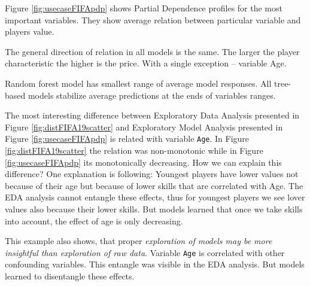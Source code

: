 \documentclass[]{krantz}
\begin{document}
Figure \ref{fig:usecaseFIFApdp} shows Partial Dependence profiles for the most important variables. They show average relation between particular variable and players value.

The general direction of relation in all models is the same. The larger the player characteristic the higher is the price. With a single exception -- variable Age.

Random forest model has smallest range of average model responses. All tree-based models stabilize average predictions at the ends of variables ranges.

The most interesting difference between Exploratory Data Analysis presented in Figure \ref{fig:distFIFA19scatter} and Exploratory Model Analysis presented in Figure \ref{fig:usecaseFIFApdp} is related with variable \texttt{Age}. In Figure \ref{fig:distFIFA19scatter} the relation was non-monotonic while in Figure \ref{fig:usecaseFIFApdp} its monotonically decreasing.
How we can explain this difference?
One explanation is following: Youngest players have lower values not because of their age but because of lower skills that are correlated with Age. The EDA analysis cannot entangle these effects, thus for youngest players we see lover values also because their lower skills. But models learned that once we take skills into account, the effect of age is only decreasing.

This example also shows, that proper \emph{exploration of models may be more insightful than exploration of raw data}. Variable \texttt{Age} is correlated with other confounding variables. This entangle was visible in the EDA analysis. But models learned to disentangle these effects.
\end{document}
